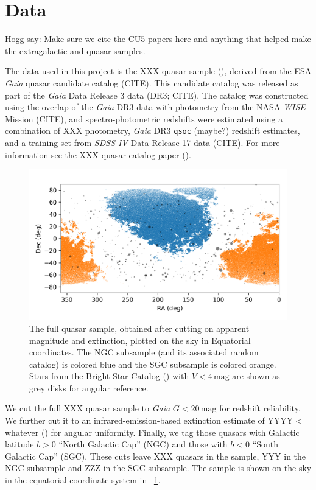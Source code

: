\documentclass[modern]{aastex631}
\newlength{\figurewidth}
\newcommand{\unit}[1]{\mathrm{#1}}
\newcommand{\mg}{\unit{mag}}
\newcommand{\figref}[1]{\figurename~\ref{#1}}
\begin{document}
\section{Data}\label{sec:data}

Hogg say: Make sure we cite the CU5 papers here and anything that helped make the extragalactic and quasar samples.

The data used in this project is the XXX quasar sample (\citealt{ksf}), derived from the ESA \textsl{Gaia} quasar candidate catalog (CITE).
This candidate catalog was released as part of the \textsl{Gaia} Data Release 3 data (DR3; CITE).
The catalog was constructed using the overlap of the \textsl{Gaia} DR3 data with photometry from the NASA \textsl{WISE} Mission (CITE), and spectro-photometric redshifts were estimated using a combination of XXX photometry, \textsl{Gaia} DR3 \texttt{qsoc} (maybe?) redshift estimates, and a training set from \textsl{SDSS-IV} Data Release 17 data (CITE).
For more information see the XXX quasar catalog paper (\citealt{ksf}).

\begin{figure}[t!]
  \begin{mdframed}
  \color{captiongray}
  \begin{center}
    \includegraphics[width=\figurewidth]{notebooks/radec.png}
  \end{center}
    \caption{The full quasar sample, obtained after cutting on apparent magnitude and extinction, plotted on the sky in Equatorial coordinates.
    The NGC subsample (and its associated random catalog) is colored blue and the SGC subsample is colored orange.
    Stars from the Bright Star Catalog (\citealt{bsc}) with $V<4\,\mg$ are shown as grey disks for angular reference.\label{fig:radec}}
  \end{mdframed}
\end{figure}
We cut the full XXX quasar sample to \textsl{Gaia} $G<20\,\mg$ for redshift reliability.
We further cut it to an infrared-emission-based extinction estimate of YYYY$<$whatever (\citealt{sfd}) for angular uniformity.
Finally, we tag those quasars with Galactic latitude $b>0$ ``North Galactic Cap'' (NGC) and those with $b<0$ ``South Galactic Cap'' (SGC).
These cuts leave XXX quasars in the sample, YYY in the NGC subsample and ZZZ in the SGC subsample.
The sample is shown on the sky in the equatorial coordinate system in \figref{fig:radec}.
\end{document}
